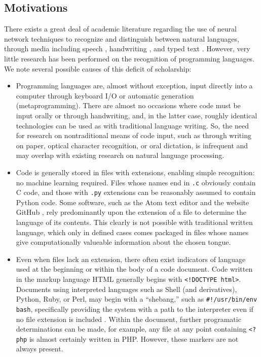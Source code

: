 \documentclass{article}
\begin{document}
\subsection{Motivations}
There exists a great deal of academic literature regarding the use of neural network techniques to recognize and distinguish between natural languages, through media including speech \cite{rnnspoken}\cite{dcrnnspoken}, handwriting \cite{handwritingex}, and typed text \cite{langidnn}\cite{langidstanford}. However, very little research has been performed on the recognition of programming languages. We note several possible causes of this deficit of scholarship:
\begin{itemize}
    \item{Programming languages are, almost without exception, input directly into a computer through keyboard I/O or automatic generation (metaprogramming). There are almost no occasions where code must be input orally or through handwriting, and, in the latter case, roughly identical technologies can be used as with traditional language writing. So, the need for research on nontraditional means of code input, such as through writing on paper, optical character recognition, or oral dictation, is infrequent and may overlap with existing research on natural language processing.}
    \item{Code is generally stored in files with extensions, enabling simple recognition: no machine learning required. Files whose names end in \texttt{.c} obviously contain C code, and those with \texttt{.py} extensions can be reasonably assumed to contain Python code. Some software, such as the Atom text editor and the website GitHub \cite{githubid}, rely predominantly upon the extension of a file to determine the language of its contents. This clearly is not possible with traditional written language, which only in defined cases comes packaged in files whose names give computationally valueable information about the chosen tongue.}
    \item{Even when files lack an extension, there often exist indicators of language used at the beginning or within the body of a code document. Code written in the markup language \cite{htmlnotproglang} HTML generally begins with \texttt{<!DOCTYPE html>}. Documents using interpreted languages such as Shell (and derivatives), Python, Ruby, or Perl, may begin with a ``shebang,'' such as \texttt{#!/usr/bin/env bash}, specifically providing the system with a path to the interpreter even if no file extension is included \cite{shebang}. Within the document, further programatic determinations can be made, for example, any file at any point containing \texttt{<?php} is almost certainly written in PHP. However, these markers are not always present.}
\end{itemize}
\end{document}
